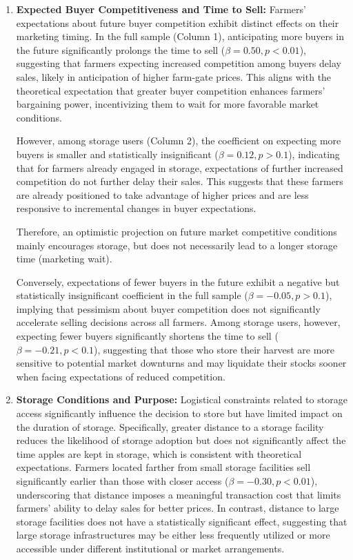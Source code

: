\begin{enumerate}
    \item \textbf{Expected Buyer Competitiveness and Time to Sell:} Farmers' expectations about future buyer competition exhibit distinct effects on their marketing timing. In the full sample (Column 1), anticipating more buyers in the future significantly prolongs the time to sell (\(\beta = 0.50, p<0.01\)), suggesting that farmers expecting increased competition among buyers delay sales, likely in anticipation of higher farm-gate prices. This aligns with the theoretical expectation that greater buyer competition enhances farmers' bargaining power, incentivizing them to wait for more favorable market conditions.
    
    However, among storage users (Column 2), the coefficient on expecting more buyers is smaller and statistically insignificant (\(\beta = 0.12, p>0.1\)), indicating that for farmers already engaged in storage, expectations of further increased competition do not further delay their sales. This suggests that these farmers are already positioned to take advantage of higher prices and are less responsive to incremental changes in buyer expectations.

    Therefore, an optimistic projection on future market competitive conditions mainly encourages storage, but does not necessarily lead to a longer storage time (marketing wait).
    
    Conversely, expectations of fewer buyers in the future exhibit a negative but statistically insignificant coefficient in the full sample (\(\beta = -0.05, p>0.1\)), implying that pessimism about buyer competition does not significantly accelerate selling decisions across all farmers. Among storage users, however, expecting fewer buyers significantly shortens the time to sell (\(\beta = -0.21, p<0.1\)), suggesting that those who store their harvest are more sensitive to potential market downturns and may liquidate their stocks sooner when facing expectations of reduced competition.
    
    \item \textbf{Storage Conditions and Purpose:} 
    Logistical constraints related to storage access significantly influence the decision to store but have limited impact on the duration of storage. Specifically, greater distance to a storage facility reduces the likelihood of storage adoption but does not significantly affect the time apples are kept in storage, which is consistent with theoretical expectations. Farmers located farther from small storage facilities sell significantly earlier than those with closer access (\(\beta = -0.30, p<0.01\)), underscoring that distance imposes a meaningful transaction cost that limits farmers' ability to delay sales for better prices. In contrast, distance to large storage facilities does not have a statistically significant effect, suggesting that large storage infrastructures may be either less frequently utilized or more accessible under different institutional or market arrangements.
    

\end{enumerate}
